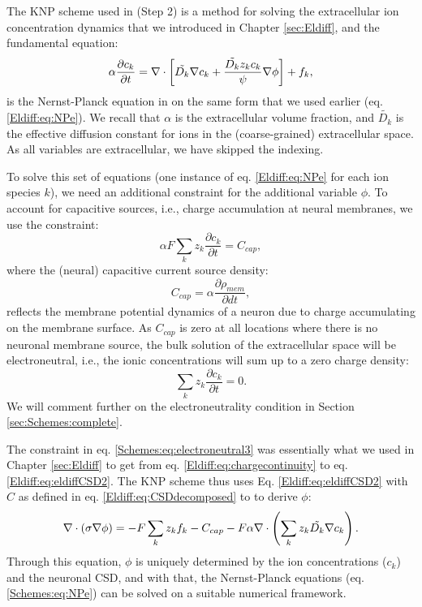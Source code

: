 The KNP scheme used in (Step 2) is a method for solving the extracellular ion concentration dynamics that we introduced in Chapter \ref{sec:Eldiff}, and the fundamental equation: 
\begin{equation}
\alpha \frac{\partial c_k}{\partial t} = {\bf \nabla} \cdot \left[ \tilde{D_k} {\bf \nabla} c_k + \frac{\tilde{D_k} z_k c_k}{\psi} {\bf \nabla} \phi \right] + f_k,
\label{Schemes:eq:NPe}
\end{equation}
is the Nernst-Planck equation in on the same form that we used earlier (eq. \ref{Eldiff:eq:NPe}). We recall that $\alpha$ is the extracellular volume fraction, and $\tilde{D_k}$ is the effective diffusion constant for ions in the (coarse-grained) extracellular space. As all variables are extracellular, we have skipped the indexing. 

To solve this set of equations (one instance of eq. \ref{Eldiff:eq:NPe} for each ion species $k$), we need an additional constraint for the additional variable $\phi$. To account for capacitive sources, i.e., charge accumulation at neural membranes, we use the constraint:
\begin{equation}
\alpha F \sum_k{z_k \frac{\partial c_k}{\partial t}} = C_{cap},
\label{Schemes:eq:electroneutral3}
\end{equation}
where the (neural) capacitive current source density:
\begin{equation}
C_{cap} = {\alpha}\frac{\partial \rho_{mem}}{\partial dt},
\label{Schemes:eq:Andreas}
\end{equation}
reflects the membrane potential dynamics of a neuron due to charge accumulating on the membrane surface. As $C_{cap}$ is zero at all locations where there is no neuronal membrane source, the bulk solution of the extracellular space will be electroneutral, i.e., the ionic concentrations will sum up to a zero charge density:
\begin{equation}
\sum_k{z_k \frac{\partial c_k}{\partial t}} = 0.
\label{Schemes:eq:electroneutral4}
\end{equation}
We will comment further on the electroneutrality condition in Section \ref{sec:Schemes:complete}.

The constraint in eq. \ref{Schemes:eq:electroneutral3} was essentially what we used in Chapter \ref{sec:Eldiff} to get from eq. \ref{Eldiff:eq:chargecontinuity} to eq. \ref{Eldiff:eq:eldiffCSD2}. The KNP scheme thus uses Eq. \ref{Eldiff:eq:eldiffCSD2} with $C$ as defined in eq.  \ref{Eldiff:eq:CSDdecomposed} to to derive $\phi$:
\begin{equation}
\nabla \cdot (\sigma\nabla\phi) = - F \sum_k z_k f_k -  C_{cap} - F\alpha \nabla \cdot \left (\sum_k{z_k \tilde{D_k}{\bf \nabla} c_{k}} \right).
\label{Schemes:eq:KNPfinal}
\end{equation}
Through this equation, $\phi$ is uniquely determined by the ion concentrations ($c_k$) and the neuronal CSD, and with that, the Nernst-Planck equations (eq. \ref{Schemes:eq:NPe}) can be solved on a suitable numerical framework.




